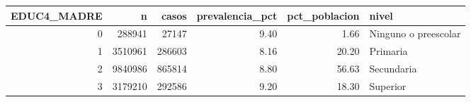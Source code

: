 \begin{tabular}{rrrrrl}
\toprule
EDUC4\_MADRE & n & casos & prevalencia\_pct & pct\_poblacion & nivel \\
\midrule
0 & 288941 & 27147 & 9.40 & 1.66 & Ninguno o preescolar \\
1 & 3510961 & 286603 & 8.16 & 20.20 & Primaria \\
2 & 9840986 & 865814 & 8.80 & 56.63 & Secundaria \\
3 & 3179210 & 292586 & 9.20 & 18.30 & Superior \\
\bottomrule
\end{tabular}
